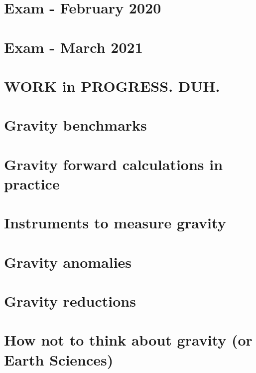 \section{Exam - February 2020} 
\newpage
\section{Exam - March 2021} 

\newpage
\section{WORK in PROGRESS. DUH.} %

\section{Gravity benchmarks} 

\newpage
\section{Gravity forward calculations in practice} 
\section{Instruments to measure gravity} 
\section{Gravity anomalies} 
\section{Gravity reductions} 
\section{How not to think about gravity (or Earth Sciences)} 
